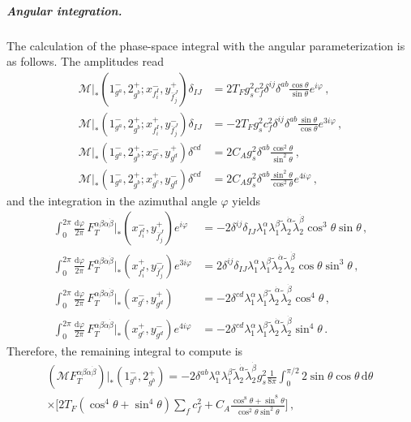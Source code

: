 \begin{subappendices}
\subparagraph{Angular integration.}
The calculation of the phase-space integral with the angular parameterization is as follows.
The amplitudes read
\begin{align}
    \mathcal M|_*(1^-_{g^a},2^+_{g^b};x_{f_i^I}^{-},y_{\bar f_j^J}^{+})\delta_{IJ} &= 2T_Fg_s^2c_f^2\delta^{ij}\delta^{ab}\frac{\cos\theta}{\sin\theta}e^{i\varphi}\,, \\
    \mathcal M|_*(1^-_{g^a},2^+_{g^b};x_{f_i^I}^{+},y_{\bar f_j^J}^{-})\delta_{IJ} &= -2T_Fg_s^2c_f^2\delta^{ij}\delta^{ab}\frac{\sin\theta}{\cos\theta}e^{3i\varphi}\,,\\
    \mathcal M|_* (1^-_{g^a},2^+_{g^b};x_{g^c}^{-},y_{g^d}^{+}) \delta^{cd} &= 2C_A g_s^2\delta^{ab}\frac{\cos^2\theta}{\sin^2\theta}\,, \\
    \mathcal M|_* (1^-_{g^a},2^+_{g^b};x_{g^c}^{+},y_{g^d}^{-}) \delta^{cd} &= 2C_A g_s^2\delta^{ab}\frac{\sin^2\theta}{\cos^2\theta}e^{4i\varphi}\,,
\end{align}
and the integration in the azimuthal angle $\varphi$ yields
\begin{align}
    \int_0^{2\pi}\frac{\text{d}\varphi}{2\pi}\,F_T^{\alpha\beta\dot\alpha\dot\beta}|_{*}(x_{f_i^I}^{-},y_{\bar f_j^J}^{+})e^{i\varphi} &= -2\delta^{ij}\delta_{IJ}\lambda_1^\alpha \lambda_1^\beta \widetilde\lambda_2^{\dot\alpha} \widetilde\lambda_2^{\dot\beta}\cos^3\theta\sin\theta\,, \\
    \int_0^{2\pi}\frac{\text{d}\varphi}{2\pi}\,F_T^{\alpha\beta\dot\alpha\dot\beta}|_{*}(x_{f_i^I}^{+},y_{\bar f_j^J}^{-})e^{3i\varphi} &=2\delta^{ij}\delta_{IJ}\lambda_1^\alpha \lambda_1^\beta \widetilde\lambda_2^{\dot\alpha} \widetilde\lambda_2^{\dot\beta} \cos\theta\sin^3\theta\,, \\
    \int_0^{2\pi}\frac{\text{d}\varphi}{2\pi}\,F_T^{\alpha\beta\dot\alpha\dot\beta}|_{*}(x_{g^c}^{-},y_{g^d}^{+}) &= -2\delta^{cd}\lambda_1^\alpha \lambda_1^\beta \widetilde\lambda_2^{\dot\alpha} \widetilde\lambda_2^{\dot\beta}\cos^4\theta\,, \\
    \int_0^{2\pi}\frac{\text{d}\varphi}{2\pi}\,F_T^{\alpha\beta\dot\alpha\dot\beta}|_{*}(x_{g^c}^{+},y_{g^d}^{-})e^{4i\varphi} &= -2\delta^{cd}\lambda_1^\alpha \lambda_1^\beta \widetilde\lambda_2^{\dot\alpha} \widetilde\lambda_2^{\dot\beta}\sin^4\theta\,.
\end{align}
Therefore, the remaining integral to compute is
\begin{multline}
    (\mathcal M F_T^{\alpha\beta\dot\alpha\dot\beta})|_{*}(1^-_{g^a},2^+_{g^b}) = -2 \delta^{ab} \lambda_1^\alpha \lambda_1^\beta \widetilde\lambda_2^{\dot\alpha} \widetilde\lambda_2^{\dot\beta}g_s^2\frac{1}{8\pi}\int_0^{\pi/2}2\sin\theta\cos\theta \,\text{d}\theta \,\\ \times \bigg[2T_F(\cos^4\theta + \sin^4\theta)\sum_f c_f^2 + C_A\frac{\cos^8\theta + \sin^8\theta}{\cos^2\theta \sin^2\theta}\bigg]\,,

\end{multline}
\end{subappendices}
